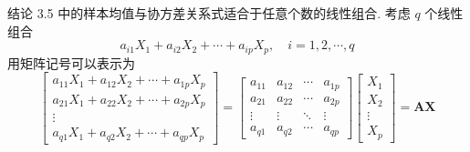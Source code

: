结论 3.5 中的样本均值与协方差关系式适合于任意个数的线性组合. 考虑 $q$ 个线性组合
\label{eq:3-37}
\begin{equation}
a_{i1}X_1+a_{i2}X_2+\cdots+a_{ip}X_p, \quad i=1,2,\cdots,q \tag{3-37}
\end{equation}
用矩阵记号可以表示为
\label{eq:3-38}
\begin{equation}
\begin{bmatrix}
a_{11}X_1+a_{12}X_2+\cdots+a_{1p}X_p\\
a_{21}X_1+a_{22}X_2+\cdots+a_{2p}X_p\\
\vdots\\
a_{q1}X_1+a_{q2}X_2+\cdots+a_{qp}X_p
\end{bmatrix}
=
\begin{bmatrix}
a_{11}&a_{12}&\cdots&a_{1p}\\
a_{21}&a_{22}&\cdots&a_{2p}\\
\vdots&\vdots&\ddots&\vdots\\
a_{q1}&a_{q2}&\cdots&a_{qp}
\end{bmatrix}
\begin{bmatrix}
X_1\\X_2\\\vdots\\X_p
\end{bmatrix}
=\mathbf{A}\mathbf{X} \tag{3-38}
\end{equation}
